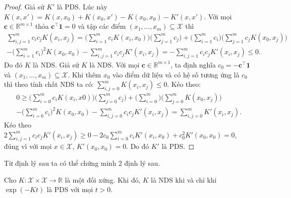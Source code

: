 \begin{proof}
  Giả sử $K'$ là PDS. Lúc này $K(x, x') = K(x, x_0) + K(x_0, x') - K(x_0, x_0)
  - K'(x, x')$. Với mọi $\mathbf{c} \in \mathbb{R}^{m \times 1}$ thỏa
  $\mathbf{c}^\intercal \mathbf{1} = 0$ và tập các điểm $(x_1,\dots, x_m)
  \subseteq \mathcal{X}$ thì \begin{multline}
    \sum_{i, j = 1}^m c_ic_jK(x_i, x_j) = \biggl(\sum_{i = 1}^mc_i K(x_i,
    x_0)\biggl)\biggl( \sum_{j = 1}^m c_j \biggr) + \biggl( \sum_{i = 1}^m
    c_i\biggr) \biggl( \sum_{j = 1}^m c_j K(x_0, x_j) \biggr) \\
    - \biggl( \sum_{i = 1}^m c_i \biggr)^2K(x_0, x_0) - \sum_{i, j = 1}^m
    c_ic_j K'(x_i, x_j) = -\sum_{i, j = 1}^m c_ic_j K'(x_i, x_j) \le 0.
  \end{multline}Do đó $K$ là NDS. Giả sử $K$ là NDS. Với mọi $\mathbf{c} \in
  \mathbb{R}^{m \times 1}$, ta định nghĩa $c_0 = - \mathbf{c}^\intercal
  \mathbf{1}$ và $(x_1, \dots, x_m) \subseteq \mathcal{X}$. Khi thêm $x_0$ vào
  điểm dữ liệu và có hệ số tương ứng là $c_0$ thì theo tính chất NDS ta có:
  $\sum_{i, j = 0}^mK(x_i, x_j) \le 0$. Kéo theo: \begin{multline}
    0\ge \biggl( \sum_{i = 0}^m c_i K(x_i, x0) \biggr) \biggl( \sum_{j = 0}^m
    c_j \biggr) + \biggl(\sum_{i = 0}^m \biggr) \biggl( \sum_{j = 0}^m K(x_0,
    x_j) \biggr ) \\
    - \biggl( \sum_{i = 0}^m c_i \biggr )^2 K(x_0, x_0) - \sum_{i, j = 0}^m
    c_ic_j K'(x_i, x_j) = \sum_{i, j = 0}^m K'(x_i, x_j).
  \end{multline} Kéo theo $2\sum_{i, j = 1}^m c_ic_j K'(x_i, x_j) \ge 0 - 2c_0
  \sum_{i = 0}^m c_iK'(x_i, x_0) + c_0^2 K'(x_0, x_0) = 0$, đúng vì với mọi $x
  \in \mathcal{X}$, $K'(x_0, x_0) = 0$. Do đó $K'$ là PDS.
\end{proof}

Từ định lý sau ta có thể chứng minh 2 định lý sau.

\begin{thm}
  Cho $K\colon \mathcal{X} \times \mathcal{X} \to \mathbb{R}$ là một
   đối xứng. Khi đó, $K$ là NDS khi và chỉ khi $\exp(-Kt)$ là PDS
  với mọi $t > 0$.
\end{thm}


